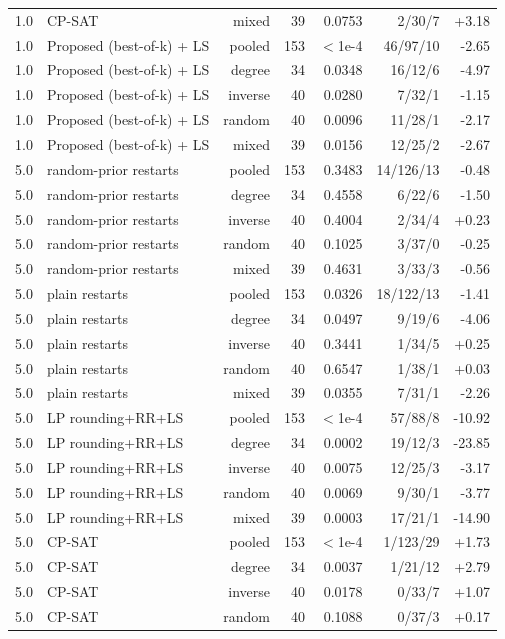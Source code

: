 \begin{table}[t]
\begin{tabular}{llrrrrr}
1.0 & CP-SAT & mixed & 39 & 0.0753 & 2/30/7 & +3.18 \\
1.0 & Proposed (best-of-k) + LS & pooled & 153 & $<$1e-4 & 46/97/10 & -2.65 \\
1.0 & Proposed (best-of-k) + LS & degree & 34 & 0.0348 & 16/12/6 & -4.97 \\
1.0 & Proposed (best-of-k) + LS & inverse & 40 & 0.0280 & 7/32/1 & -1.15 \\
1.0 & Proposed (best-of-k) + LS & random & 40 & 0.0096 & 11/28/1 & -2.17 \\
1.0 & Proposed (best-of-k) + LS & mixed & 39 & 0.0156 & 12/25/2 & -2.67 \\
5.0 & random-prior restarts & pooled & 153 & 0.3483 & 14/126/13 & -0.48 \\
5.0 & random-prior restarts & degree & 34 & 0.4558 & 6/22/6 & -1.50 \\
5.0 & random-prior restarts & inverse & 40 & 0.4004 & 2/34/4 & +0.23 \\
5.0 & random-prior restarts & random & 40 & 0.1025 & 3/37/0 & -0.25 \\
5.0 & random-prior restarts & mixed & 39 & 0.4631 & 3/33/3 & -0.56 \\
5.0 & plain restarts & pooled & 153 & 0.0326 & 18/122/13 & -1.41 \\
5.0 & plain restarts & degree & 34 & 0.0497 & 9/19/6 & -4.06 \\
5.0 & plain restarts & inverse & 40 & 0.3441 & 1/34/5 & +0.25 \\
5.0 & plain restarts & random & 40 & 0.6547 & 1/38/1 & +0.03 \\
5.0 & plain restarts & mixed & 39 & 0.0355 & 7/31/1 & -2.26 \\
5.0 & LP rounding+RR+LS & pooled & 153 & $<$1e-4 & 57/88/8 & -10.92 \\
5.0 & LP rounding+RR+LS & degree & 34 & 0.0002 & 19/12/3 & -23.85 \\
5.0 & LP rounding+RR+LS & inverse & 40 & 0.0075 & 12/25/3 & -3.17 \\
5.0 & LP rounding+RR+LS & random & 40 & 0.0069 & 9/30/1 & -3.77 \\
5.0 & LP rounding+RR+LS & mixed & 39 & 0.0003 & 17/21/1 & -14.90 \\
5.0 & CP-SAT & pooled & 153 & $<$1e-4 & 1/123/29 & +1.73 \\
5.0 & CP-SAT & degree & 34 & 0.0037 & 1/21/12 & +2.79 \\
5.0 & CP-SAT & inverse & 40 & 0.0178 & 0/33/7 & +1.07 \\
5.0 & CP-SAT & random & 40 & 0.1088 & 0/37/3 & +0.17 \\

\end{tabular}
\end{table}
